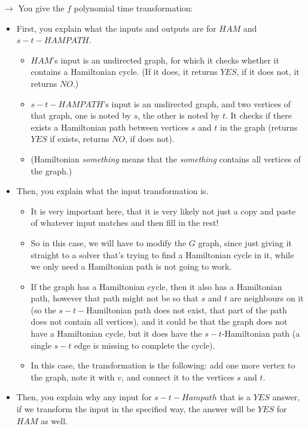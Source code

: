 \begin{itemize}
    $\rightarrow$ You give the $f$ polynomial time transformation:
    \begin{itemize}
        \item First, you explain what the inputs and outputs are for $HAM$ and $s-t-HAMPATH$.
        \begin{itemize}
            \item $HAM$'s input is an undirected graph, for which it checks whether it contains a Hamiltonian cycle. (If it does, it returns $YES$, if it does not, it returns $NO$.)
            \item $s-t-HAMPATH$'s input is an undirected graph, and two vertices of that graph, one is noted by $s$, the other is noted by $t$. It checks if there exists a Hamiltonian path between vertices $s$ and $t$ in the graph (returns $YES$ if exists, returns $NO$, if does not).
            \item (Hamiltonian \textit{something} means that the \textit{something} contains all vertices of the graph.)
        \end{itemize}
        \item Then, you explain what the input transformation is.
        \begin{itemize}
            \item It is very important here, that it is very likely not just a copy and paste of whatever input matches and then fill in the rest!
            \item  So in this case, we will have to modify the $G$ graph, since just giving it straight to a solver that's trying to find a Hamiltonian cycle in it, while we only need a Hamiltonian path is not going to work.
            \item If the graph has a Hamiltonian cycle, then it also has a Hamiltonian path, however that path might not be so that $s$ and $t$ are neighbours on it (so the $s-t-$Hamiltonian path does not exist, that part of the path does not contain all vertices), and it could be that the graph does not have a Hamiltonian cycle, but it does have the $s-t$-Hamiltonian path (a single $s-t$ edge is missing to complete the cycle).
            \item In this case, the transformation is the following: add one more vertex to the graph, note it with $v$, and connect it to the vertices $s$ and $t$.
        \end{itemize}
        \item Then, you explain why any input for $s-t-Hampath$ that is a $YES$ answer, if we transform the input in the specified way, the answer will be $YES$ for $HAM$ as well.

\end{itemize}
\end{itemize}
